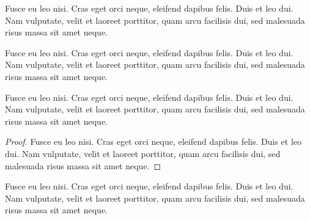 \documentclass[a4paper,UKenglish,cleveref, autoref]{lipics-v2019}
\begin{document}
\begin{remark*}
Fusce eu leo nisi. Cras eget orci neque, eleifend dapibus felis. Duis et leo dui. Nam vulputate, velit et laoreet porttitor, quam arcu facilisis dui, sed malesuada risus massa sit amet neque.
\end{remark*}

\begin{claim}\label{testenv-claim}
Fusce eu leo nisi. Cras eget orci neque, eleifend dapibus felis. Duis et leo dui. Nam vulputate, velit et laoreet porttitor, quam arcu facilisis dui, sed malesuada risus massa sit amet neque.
\end{claim}

\begin{claim*}\label{testenv-claim2}
Fusce eu leo nisi. Cras eget orci neque, eleifend dapibus felis. Duis et leo dui. Nam vulputate, velit et laoreet porttitor, quam arcu facilisis dui, sed malesuada risus massa sit amet neque.
\end{claim*}

\begin{proof}
Fusce eu leo nisi. Cras eget orci neque, eleifend dapibus felis. Duis et leo dui. Nam vulputate, velit et laoreet porttitor, quam arcu facilisis dui, sed malesuada risus massa sit amet neque.
\end{proof}

\begin{claimproof}
Fusce eu leo nisi. Cras eget orci neque, eleifend dapibus felis. Duis et leo dui. Nam vulputate, velit et laoreet porttitor, quam arcu facilisis dui, sed malesuada risus massa sit amet neque.
\end{claimproof}
\end{document}
